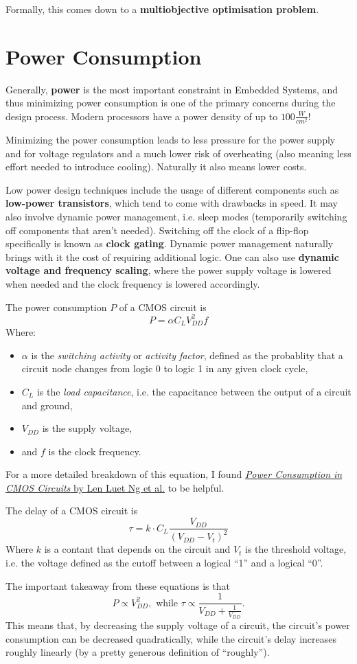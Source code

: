 \documentclass{report}
\newcommand{\tbf}{\textbf}
\newcommand*{\newpar}{\par\vspace{\baselineskip}\noindent} %
\begin{document}
\newpar
Formally, this comes down to a \tbf{multiobjective optimisation problem}.
\section{Power Consumption}
Generally, \tbf{power} is the most important constraint in Embedded Systems, and thus minimizing power consumption is one of the primary concerns during the design process. Modern processors have a power density of up to $100 \frac{W}{cm^2}$!
\newpar
Minimizing the power consumption leads to less pressure for the power supply and for voltage regulators and a much lower risk of overheating (also meaning less effort needed to introduce cooling). Naturally it also means lower costs.
\newpar
Low power design techniques include the usage of different components such as \tbf{low-power transistors}, which tend to come with drawbacks in speed. It may also involve dynamic power management, i.e. sleep modes (temporarily switching off components that aren't needed). Switching off the clock of a flip-flop specifically is known as \tbf{clock gating}. Dynamic power management naturally brings with it the cost of requiring additional logic. One can also use \tbf{dynamic voltage and frequency scaling}, where the power supply voltage is lowered when needed and the clock frequency is lowered accordingly.
\newpar
The power consumption $P$ of a CMOS circuit is
\begin{equation*}
P = \alpha C_L V_{DD}^2f
\end{equation*}
Where:
\begin{itemize}
 \item $\alpha$ is the \textit{switching activity} or \textit{activity factor}, defined as the probablity that a circuit node changes from logic 0 to logic 1 in any given clock cycle,
 \item $C_L$ is the \textit{load capacitance}, i.e. the capacitance between the output of a circuit and ground,
 \item $V_{DD}$ is the supply voltage,
 \item and $f$ is the clock frequency.
\end{itemize}
\newpar
For a more detailed breakdown of this equation, I found \href{https://cdn.intechopen.com/pdfs/82415.pdf}{\textit{Power Consumption in CMOS
Circuits} by Len Luet Ng et al.} to be helpful.
\newpar
The delay of a CMOS circuit is
\begin{equation*}
\tau = k \cdot C_L \frac{V_{DD}}{(V_{DD}-V_t)^2}
\end{equation*}
Where $k$ is a contant that depends on the circuit and $V_t$ is the threshold voltage, i.e. the voltage defined as the cutoff between a logical ``1'' and a logical ``0''.
\newpar
The important takeaway from these equations is that
\begin{equation*}
P \propto V_{DD}^2, \text{ while } \tau \propto \frac{1}{V_{DD} + \frac{1}{V_{DD}}}.
\end{equation*}
This means that, by decreasing the supply voltage of a circuit, the circuit's power consumption can be decreased quadratically, while the circuit's delay increases roughly linearly (by a pretty generous definition of ``roughly'').
%
\end{document}
